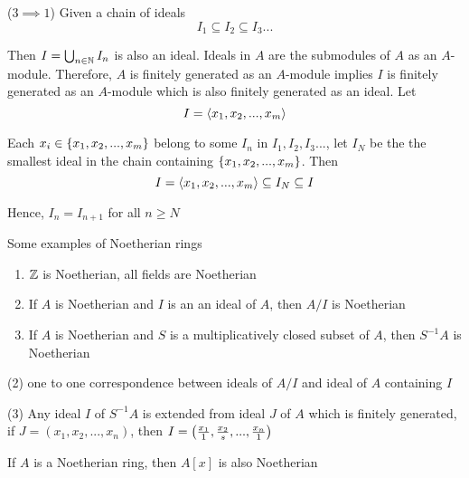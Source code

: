 \begin{longproof}
	($3 \implies 1$) Given a chain of ideals
	$$
	I_1 \subseteq I_2 \subseteq I_3 ...
	$$
	
	Then $I = \bigcup_{n \in \N} I_n$ is also an ideal. Ideals in $A$ are the submodules of $A$ as an $A$-module. Therefore, $A$ is finitely generated as an $A$-module implies $I$ is finitely generated as an $A$-module which is also finitely generated as an ideal. Let
	$$
	I = \inner{x_1, x_2, ..., x_m}
	$$
	
	Each $x_i \in \set{x_1, x_2, ..., x_m}$ belong to some $I_n$ in $I_1, I_2, I_3 ...$, let $I_N$ be the the smallest ideal in the chain containing $\set{x_1, x_2, ..., x_m}$. Then
	$$
	I = \inner{x_1, x_2, ..., x_m} \subseteq I_N \subseteq I
	$$
	
	Hence, $I_{n} = I_{n+1}$ for all $n \geq N$
\end{longproof}

\begin{remark}
	Some examples of Noetherian rings
	\begin{enumerate}
		\item $\Z$ is Noetherian, all fields are Noetherian
		\item If $A$ is Noetherian and $I$ is an an ideal of $A$, then $A / I$ is Noetherian
		\item If $A$ is Noetherian and $S$ is a multiplicatively closed subset of $A$, then $S^{-1} A$ is Noetherian
	\end{enumerate}
\end{remark}

\begin{longproof}
	(2) one to one correspondence between ideals of $A / I$ and ideal of $A$ containing $I$
	
	(3) Any ideal $I$ of $S^{-1} A$ is extended from ideal $J$ of $A$ which is finitely generated, if $J = (x_1, x_2, ..., x_n)$, then $I = \tuple*{\frac{x_1}{1}, \frac{x_2}{s}, ..., \frac{x_n}{1}}$
\end{longproof}


\begin{theorem}
	If $A$ is a Noetherian ring, then $A[x]$ is also Noetherian
\end{theorem}

